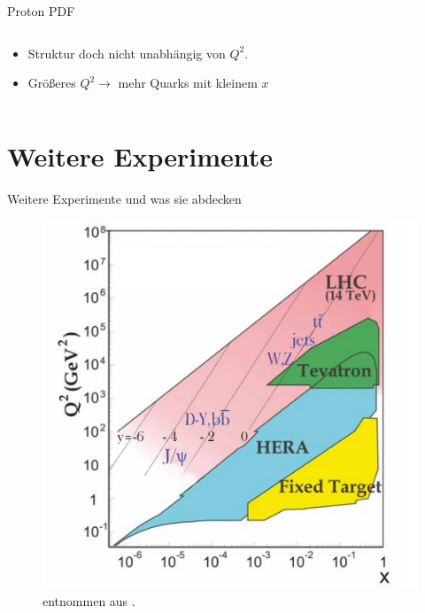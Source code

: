 \documentclass[aspectratio=1610, 9pt]{beamer}
\begin{document}
\begin{frame}{Proton PDF}
\begin{columns}
\begin{column}{0.5\textwidth}
\begin{itemize}
\begin{itemize}
        \end{itemize}
        \item{Struktur doch nicht unabhängig von $Q^2$.}
        \item{Größeres $Q^2 \rightarrow $ mehr Quarks mit kleinem $x$}
      \end{itemize}
    \end{column}

  \end{columns}
\end{frame}

\section{Weitere Experimente}
\begin{frame}{Weitere Experimente und was sie abdecken}
  \begin{figure}
    \centering
    \includegraphics[scale=0.35]{images/Experimente.png}
    \caption{entnommen aus \cite{Paper-TP}.}
  \end{figure}
\end{frame}
\end{document}
